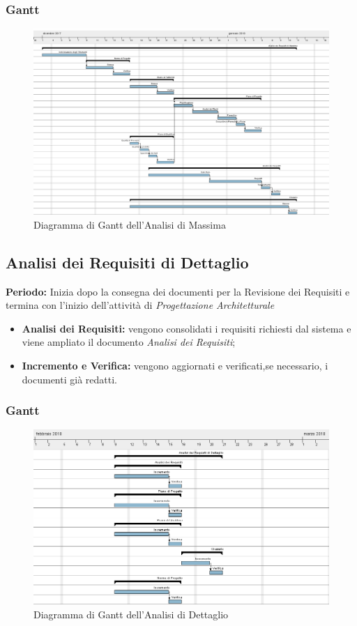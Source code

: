 \subsubsection{Gantt}
\begin{figure}[h!]
	\centering 
	\includegraphics[width=1\textwidth]{images/Analisi-di-Massima.png}
	\caption{Diagramma di Gantt dell'Analisi di Massima}
	\label{graficobello} 
\end{figure}
\subsection{Analisi dei Requisiti di Dettaglio}
    \textbf{Periodo:}
    Inizia dopo la consegna dei documenti per la Revisione dei Requisiti e termina con l'inizio dell'attività di \emph{Progettazione Architetturale}
    \begin{itemize}
    	\item \textbf{Analisi dei Requisiti:} vengono consolidati i requisiti richiesti dal sistema e viene ampliato il documento \emph{Analisi dei Requisiti};
    	\item \textbf{Incremento e Verifica:} vengono aggiornati e verificati,se necessario, i documenti già redatti. 
    \end{itemize}
\subsubsection{Gantt}
\begin{figure}[h!]
	\centering 
	\includegraphics[width=1\textwidth]{images/Analisi-Dettaglio.png}
	\caption{Diagramma di Gantt dell'Analisi di Dettaglio}
	\label{graficobello2} 
\end{figure}
